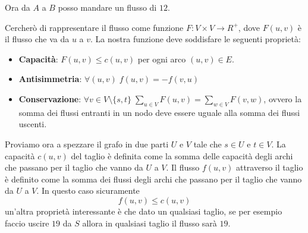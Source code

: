 \documentclass[a4paper]{article}
\begin{document}
\noindent
Ora da $A$ a $B$ posso mandare un flusso di $12$.
\begin{figure}[H]
  \centering
\end{figure}
\noindent
Cercherò di rappresentare il flusso come funzione $F : V \times V \rightarrow R^+$, dove $F(u,v)$ è il flusso che va da $u$ a $v$.
La nostra funzione deve soddisfare le seguenti proprietà:
\begin{itemize}
  \item \textbf{Capacità}: $F(u,v) \le c(u,v)$ per ogni arco $(u,v) \in E$.
  \item \textbf{Antisimmetria}: $\forall (u,v) \; f(u,v) = -f(v,u)$
  \item \textbf{Conservazione}: $\forall v \in V \setminus \{s,t\} \; \sum_{u \in V} F(u,v) = \sum_{w \in V} F(v,w)$, ovvero la somma dei flussi entranti in un nodo deve essere uguale alla somma dei flussi uscenti.
\end{itemize}
Proviamo ora a spezzare il grafo in due parti $U$ e $V$ tale che $s \in U$ e $t \in V$.
La capacità $c(u,v)$ del taglio è definita come la somma delle capacità degli archi che passano per il taglio che vanno da $U$ a $V$.
Il flusso $f(u,v)$ attraverso il taglio è definito come la somma dei flussi degli archi che passano per il taglio che vanno da $U$ a $V$.
In questo caso sicuramente \[f(u,v) \le c(u,v)\]
un'altra proprietà interessante è che dato un qualsiasi taglio, se per esempio faccio uscire $19$ da $S$ allora in qualsiasi taglio il flusso sarà $19$.
\end{document}
